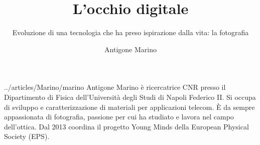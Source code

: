 ﻿\title{L'occhio digitale}
\subtitle{Evoluzione di una tecnologia che ha preso ispirazione dalla vita: la fotografia}
\suptitle{\phantom{x}}
\author{Antigone Marino}
\maketitle
\begin{small}
\pichskip{4mm}
\nobalance



\vfill
\begin{thebiography}{../articles/Marino/marino}
Antigone Marino è ricercatrice CNR presso il Dipartimento di Fisica dell'Università degli Studi di Napoli Federico II. Si occupa di sviluppo e caratterizzazione di materiali per applicazioni telecom. È da sempre appassionata di fotografia, passione per cui ha studiato e lavora nel campo dell'ottica. Dal 2013 coordina il progetto Young Minds della European Physical Society (EPS).
\end{thebiography}
\end{small}

